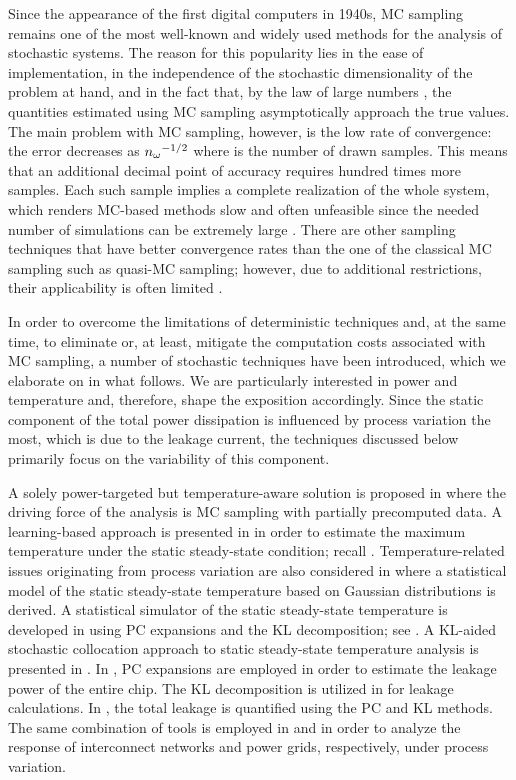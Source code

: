Since the appearance of the first digital computers in 1940s, \acf{MC} sampling
remains one of the most well-known and widely used methods for the analysis of
stochastic systems. The reason for this popularity lies in the ease of
implementation, in the independence of the stochastic dimensionality of the
problem at hand, and in the fact that, by the law of large numbers
\cite{durrett2010}, the quantities estimated using \ac{MC} sampling
asymptotically approach the true values. The main problem with \ac{MC} sampling,
however, is the low rate of convergence: the error decreases as ${n_\mathrm{\omega}}^{-1/2}$
where \no is the number of drawn samples. This means that an additional decimal
point of accuracy requires hundred times more samples. Each such sample implies
a complete realization of the whole system, which renders \ac{MC}-based methods
slow and often unfeasible since the needed number of simulations can be
extremely large \cite{diaz-emparanza2002}. There are other sampling techniques
that have better convergence rates than the one of the classical \ac{MC}
sampling such as quasi-\ac{MC} sampling; however, due to additional
restrictions, their applicability is often limited \cite{xiu2010}.

In order to overcome the limitations of deterministic techniques and, at the
same time, to eliminate or, at least, mitigate the computation costs associated
with \ac{MC} sampling, a number of stochastic techniques have been introduced,
which we elaborate on in what follows. We are particularly interested in power
and temperature and, therefore, shape the exposition accordingly. Since the
static component of the total power dissipation is influenced by process
variation the most, which is due to the leakage current, the techniques
discussed below primarily focus on the variability of this component.

A solely power-targeted but temperature-aware solution is proposed in
\cite{chandra2010} where the driving force of the analysis is \ac{MC} sampling
with partially precomputed data. A learning-based approach is presented in
\cite{juan2011} in order to estimate the maximum temperature under the static
steady-state condition; recall . Temperature-related
issues originating from process variation are also considered in \cite{juan2012}
where a statistical model of the static steady-state temperature based on
Gaussian distributions is derived. A statistical simulator of the static
steady-state temperature is developed in \cite{huang2009a} using \ac{PC}
expansions and the \acf{KL} decomposition; see
. A \ac{KL}-aided stochastic collocation
\cite{xiu2010} approach to static steady-state temperature analysis is presented
in \cite{lee2013}. In \cite{shen2009}, \ac{PC} expansions are employed in order
to estimate the leakage power of the entire chip. The \ac{KL} decomposition is
utilized in \cite{bhardwaj2006} for leakage calculations. In
\cite{bhardwaj2008}, the total leakage is quantified using the \ac{PC} and
\ac{KL} methods. The same combination of tools is employed in
\cite{vrudhula2006} and \cite{ghanta2006} in order to analyze the response of
interconnect networks and power grids, respectively, under process variation.

